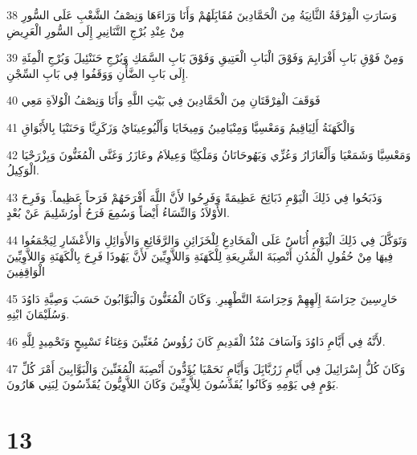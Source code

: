 \par 38 وَسَارَتِ الْفِرْقَةُ الثَّانِيَةُ مِنَ الْحَمَّادِينَ مُقَابَِلَهُمْ وَأَنَا وَرَاءَهَا وَنِصْفُ الشَّعْبِ عَلَى السُّورِ مِنْ عِنْدِ بُرْجِ التَّنَانِيرِ إِلَى السُّورِ الْعَرِيضِ
\par 39 وَمِنْ فَوْقِ بَابِ أَفْرَايِمَ وَفَوْقَ الْبَابِ الْعَتِيقِ وَفَوْقَ بَابِ السَّمَكِ وَبُرْجِ حَنَنْئِيلَ وَبُرْجِ الْمِئَةِ إِلَى بَابِ الضَّأْنِ وَوَقَفُوا فِي بَابِ السِّجْنِ.
\par 40 فَوَقَفَ الْفِرْقَتَانِ مِنَ الْحَمَّادِينَ فِي بَيْتِ اللَّهِ وَأَنَا وَنِصْفُ الْوُلاَةِ مَعِي
\par 41 وَالْكَهَنَةُ أَلِيَاقِيمُ وَمَعْسِيَّا وَمِنْيَامِينُ وَمِيخَايَا وَأَلْيُوعِينَايُ وَزَكَرِيَّا وَحَنَنْيَا بِالأَبْوَاقِ
\par 42 وَمَعْسِيَّا وَشَمَعْيَا وَأَلْعَازَارُ وَعُزِّي وَيَهُوحَانَانُ وَمَلْكِيَّا وَعِيلاَمُ وعَازَرُ وَغَنَّى الْمُغَنُّونَ وَيِزْرَحْيَا الْوَكِيلُ.
\par 43 وَذَبَحُوا فِي ذَلِكَ الْيَوْمِ ذَبَائِحَ عَظِيمَةً وَفَرِحُوا لأَنَّ اللَّهَ أَفْرَحَهُمْ فَرَحاً عَظِيماً. وَفَرِحَ الأَوْلاَدُ وَالنِّسَاءُ أَيْضاً وَسُمِعَ فَرَحُ أُورُشَلِيمَ عَنْ بُعْدٍ.
\par 44 وَتَوَكَّلَ فِي ذَلِكَ الْيَوْمِ أُنَاسٌ عَلَى الْمَخَادِعِ لِلْخَزَائِنِ وَالرَّفَائِعِ وَالأَوَائِلِ وَالأَعْشَارِ لِيَجْمَعُوا فِيهَا مِنْ حُقُولِ الْمُدُنِ أَنْصِبَةَ الشَّرِيعَةِ لِلْكَهَنَةِ وَاللاَّوِيِّينَ لأَنَّ يَهُوذَا فَرِحَ بِالْكَهَنَةِ وَاللاَّوِيِّينَ الْوَاقِفِينَ
\par 45 حَارِسِينَ حِرَاسَةَ إِلَهِهِمْ وَحِرَاسَةَ التَّطْهِيرِ. وَكَانَ الْمُغَنُّونَ وَالْبَوَّابُونَ حَسَبَ وَصِيَّةِ دَاوُدَ وَسُلَيْمَانَ ابْنِهِ.
\par 46 لأَنَّهُ فِي أَيَّامِ دَاوُدَ وَآسَافَ مُنْذُ الْقَدِيمِ كَانَ رُؤُوسُ مُغَنِّينَ وَغِنَاءُ تَسْبِيحٍ وَتَحْمِيدٍ لِلَّهِ.
\par 47 وَكَانَ كُلُّ إِسْرَائِيلَ فِي أَيَّامِ زَرُبَّابَِلَ وَأَيَّامِ نَحَمْيَا يُؤَدُّونَ أَنْصِبَةَ الْمُغَنِّينَ وَالْبَوَّابِينَ أَمْرَ كُلِّ يَوْمٍ فِي يَوْمِهِ وَكَانُوا يُقَدِّسُونَ لِلاَّوِيِّينَ وَكَانَ اللاَّوِيُّونَ يُقَدِّسُونَ لِبَنِي هَارُونَ.

\chapter{13}

